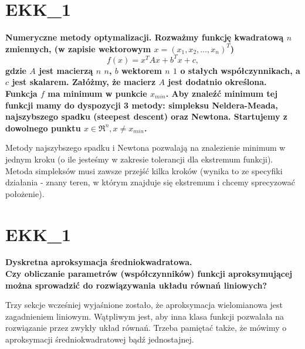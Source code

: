 \section{EKK\_1}
\textbf{Numeryczne metody optymalizacji.
Rozważmy funkcję kwadratową $n$ zmiennych, (w zapisie wektorowym $x=(x_1,x_2,\ldots,x_n)^T$)
$$f(x)=x^TAx+b^Tx+c,$$ gdzie $A$ jest macierzą $n$ \texttimes $n$, $b$ wektorem $n$ \texttimes $1$ o stałych współczynnikach, a $c$ jest skalarem. Załóżmy, że macierz $A$ jest dodatnio określona. Funkcja $f$ ma minimum w punkcie $x_{min}$.
Aby znaleźć minimum tej funkcji mamy do dyspozycji 3 metody: simpleksu Neldera-Meada, najszybszego spadku (steepest descent) oraz Newtona. Startujemy z dowolnego punktu $x \in \Re^n, x \neq x_{min}$. 
}

\vspace{0.4cm}
\noindent Metody najszybszego spadku i Newtona pozwalają na znalezienie minimum w jednym kroku (o ile jesteśmy w zakresie tolerancji dla ekstremum funkcji). Metoda simpleksów musi zawsze przejść kilka kroków (wynika to ze specyfiki działania - znany teren, w którym znajduje się ekstremum i chcemy sprecyzować położenie).

\section{EKK\_1}
\textbf{Dyskretna aproksymacja średniokwadratowa. \\
Czy obliczanie parametrów (współczynników) funkcji aproksymującej można sprowadzić do rozwiązywania układu równań liniowych?
}

\vspace{0.4cm}
\noindent Trzy sekcje wcześniej wyjaśnione zostało, że aproksymacja wielomianowa jest zagadnieniem liniowym. Wątpliwym jest, aby inna klasa funkcji pozwalała na rozwiązanie przez zwykły układ równań. Trzeba pamiętać także, że mówimy o aproksymacji średniokwadratowej bądź jednostajnej.

